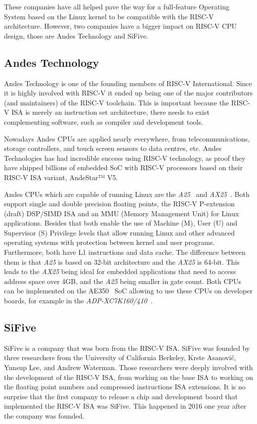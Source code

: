 These companies have all helped pave the way for a full-feature Operating System based on the Linux kernel to be compatible with the RISC-V architecture. However, two companies have a bigger impact on RISC-V CPU design, those are Andes Technology and SiFive.

\subsection{Andes Technology}
Andes Technology is one of the founding members of RISC-V International. Since it is highly involved with RISC-V it ended up being one of the major contributors (and maintainers) of the RISC-V toolchain. This is important because the RISC-V ISA is merely an instruction set architecture, there needs to exist complementing software, such as compiler and development tools.

Nowadays Andes CPUs are applied nearly everywhere, from telecommunications, storage controllers, and touch screen sensors to data centres, etc. Andes Technologies has had incredible success using RISC-V technology, as proof they have shipped billions of embedded SoC with RISC-V processors based on their RISC-V ISA variant, AndeStar™ V5.

Andes CPUs which are capable of running Linux are the \textit{A25}~\cite{a25} and \textit{AX25}~\cite{ax25}. Both support single and double precision floating points, the RISC-V P-extension (draft) DSP/SIMD ISA and an MMU (Memory Management Unit) for Linux applications. Besides that both enable the use of Machine (M), User (U) and Supervisor (S) Privilege levels that allow running Linux and other advanced operating systems with protection between kernel and user programs. Furthermore, both have L1 instructions and data cache. The difference between them is that \textit{A25} is based on 32-bit architecture and the \textit{AX25} is 64-bit. This leads to the \textit{AX25} being ideal for embedded applications that need to access address space over 4GB, and the \textit{A25} being smaller in gate count. Both CPUs can be implemented on the AE350~\cite{ae350} SoC allowing to use these CPUs on developer boards, for example in the \textit{ADP-XC7K160/410}~\cite{adp-xc7k160}.

\subsection{SiFive}
SiFive is a company that was born from the RISC-V ISA. SiFive was founded by three researchers from the University of California Berkeley, Krste Asanović, Yunsup Lee, and Andrew Waterman. Those researchers were deeply involved with the development of the RISC-V ISA, from working on the base ISA to working on the floating point numbers and compressed instructions ISA extensions. It is no surprise that the first company to release a chip and development board that implemented the RISC-V ISA was SiFive. This happened in 2016 one year after the company was founded.

